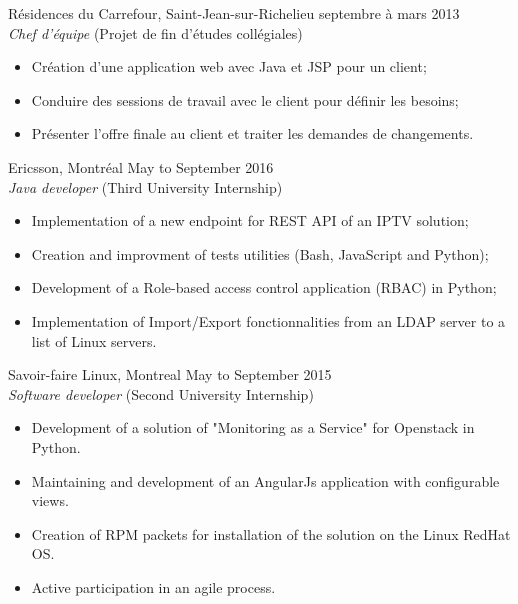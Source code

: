 \documentclass{res}
\newcommand{\inEnglish}[1]{#1}
\begin{document}
\begin{resume}
{	%
	Résidences du Carrefour, Saint-Jean-sur-Richelieu
	\hfill septembre à mars 2013 \\
	{\sl Chef d'équipe} \hfill (Projet de fin d'études collégiales)
	\vspace{0.05in}

	\begin{itemize} \itemsep -2pt
		\item Création d’une application web avec Java et JSP pour un client;
		\item Conduire des sessions de travail avec le client pour définir les besoins;
		\item Présenter l’offre finale au client et traiter les demandes de changements.
	\end{itemize}

}

\inEnglish{
	Ericsson, Montréal\footnotemark
	\hfill May to September 2016 \\
	{\sl Java developer} \hfill (Third University Internship)
	\vspace{0.05in}

	\begin{itemize} \itemsep -2pt
		\item Implementation of a new endpoint for REST API of an IPTV solution;
		\item Creation and improvment of tests utilities (Bash, JavaScript and Python);
		\item Development of a Role-based access control application (RBAC) in Python;
		\item Implementation of Import/Export fonctionnalities from an LDAP server to a list of Linux servers.
	\end{itemize}

	Savoir-faire Linux, Montreal
	\hfill May to September 2015 \\
	{\sl Software developer} \hfill (Second University Internship)
	\vspace{0.05in}

	\begin{itemize} \itemsep -2pt
		\item Development of a solution of "Monitoring as a Service" for Openstack in Python.
		\item Maintaining and development of an AngularJs application with configurable views.
		\item Creation of RPM packets for installation of the solution on the Linux RedHat OS.
		\item Active participation in an agile process.
	\end{itemize}

}
\end{resume}
\end{document}
